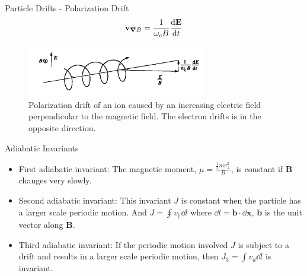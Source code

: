 \begin{frame}{Particle Drifts - Polarization Drift}
    \begin{equation}
        \mathbf{v}_{\grad B} = \frac{1}{\omega_cB}\dv{\mathbf{E}}{t}
        \label{eq:polarization-drift}
    \end{equation}
    \begin{figure}
        \centering
        \includegraphics[width=0.7\textwidth]{figures/polarization-drift.png}
        \caption{Polarization drift of an ion caused by an increasing electric field perpendicular to the magnetic field. The electron drifts is in the opposite direction.}
        \label{fig:polarization-drift}
    \end{figure}
\end{frame}

\begin{frame}{Adiabatic Invariants}
    \begin{itemize}
        \item First adiabatic invariant: The magnetic moment, $\mu = \frac{\frac{1}{2}mv_\perp^2}{B}$, is constant if $\mathbf{B}$ changes very slowly.
        \item Second adiabatic invariant: This invariant $J$ is constant when the particle has a larger scale periodic motion. And $J = \oint v_\parallel\dd{l}$ where $\dd{l} = \mathbf{b}\cdot\dd{\mathbf{x}}$, $\mathbf{b}$ is the unit vector along $\mathbf{B}$.
        \item Third adiabatic invariant: If the periodic motion involved $J$ is subject to a drift and results in a larger scale periodic motion, then $J_3=\int v_d\dd{l}$ is invariant.
    \end{itemize}
\end{frame}